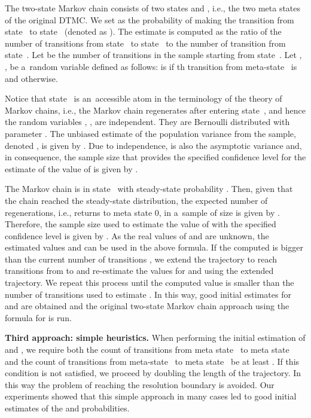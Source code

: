 \documentclass[runningheads,a4paper]{llncs}
\begin{document}
The two-state Markov chain consists of two states  and , i.e., the two meta states of the
original DTMC. We set  as the probability of making the transition from state~ to
state~ (denoted as ).
The estimate  is computed as  the ratio of the number of transitions from state~
to state~ to the number of transition from state~. Let  be the number of
transitions in the sample starting from state~. Let , , be
a~random variable defined as follows:  is  if th transition from meta-state~ is
 and  otherwise.

Notice that state~ is an~accessible atom in the terminology of the theory of Markov chains,
i.e., the Markov chain regenerates after entering state~, and hence the random variables
, , are independent. They are Bernoulli distributed with
parameter . The unbiased estimate of the population variance from the sample, denoted
, is given by
.
Due to independence,  is also the asymptotic variance and, in consequence, the
sample size that provides the specified confidence level for the estimate of the value of 
is given by
.


The Markov chain is in state~ with steady-state probability . Then,
given that the chain reached the steady-state distribution, the expected number of regenerations,
i.e., returns to meta state 0, in a~sample of size  is given by
. Therefore, the sample size used to estimate the value of
 with the specified confidence level  is given by 
. As the real
values of  and  are unknown, the estimated values  and 
can be used in the above formula. If the computed  is bigger than the current number
of transitions , we extend the trajectory to reach  transitions from 
to  and re-estimate the values for  and  using the extended trajectory. We
repeat this process until the computed  value is smaller than the number of
transitions used to estimate . In this way, good initial estimates for  and
 are obtained and the original two-state Markov chain approach using the formula for
 is run.



\medskip
\noindent
{\bf Third approach: simple heuristics.}
When performing the initial estimation of  and , we require both the count of
transitions from meta state~ to meta state~ and the count of transitions from meta-state~
to meta state~ be at least . If this condition is not satisfied, we proceed by doubling the
length of the trajectory. In this way the problem of reaching the resolution boundary is
avoided. Our experiments showed that this simple approach in many cases led to good initial
estimates of the  and  probabilities.
\end{document}

